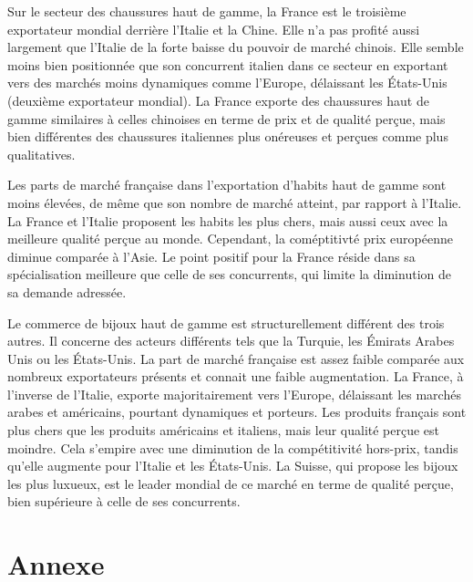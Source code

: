 \documentclass[french,10pt,a4paper]{article}
\begin{document}
\bigskip

Sur le secteur des chaussures haut de gamme, la France est le troisième exportateur mondial derrière l'Italie et la Chine. Elle n'a pas profité aussi largement que l'Italie de la forte baisse du pouvoir de marché chinois. Elle semble moins bien positionnée que son concurrent italien dans ce secteur en exportant vers des marchés moins dynamiques comme l'Europe, délaissant les États-Unis (deuxième exportateur mondial). La France exporte des chaussures haut de gamme similaires à celles chinoises en terme de prix et de qualité perçue, mais bien différentes des chaussures italiennes plus onéreuses et perçues comme plus qualitatives.

\bigskip
Les parts de marché française dans l'exportation d'habits haut de gamme sont moins élevées, de même que son nombre de marché atteint, par rapport à l'Italie. La France et l'Italie proposent les habits les plus chers, mais aussi ceux avec la meilleure qualité perçue au monde. Cependant, la coméptitivté prix européenne diminue comparée à l'Asie. Le point positif pour la France réside dans sa spécialisation meilleure que celle de ses concurrents, qui limite la diminution de sa demande adressée.

\bigskip

Le commerce de bijoux haut de gamme est structurellement différent des trois autres. Il concerne des acteurs différents tels que la Turquie, les Émirats Arabes Unis ou les États-Unis. La part de marché française est assez faible comparée aux nombreux exportateurs présents et connait une faible augmentation. La France, à l'inverse de l'Italie, exporte majoritairement vers l'Europe, délaissant les marchés arabes et américains, pourtant dynamiques et porteurs. Les produits français sont plus chers que les produits américains et italiens, mais leur qualité perçue est moindre. Cela s'empire avec une diminution de la compétitivité hors-prix, tandis qu'elle augmente pour l'Italie et les États-Unis. La Suisse, qui propose les bijoux les plus luxueux, est le leader mondial de ce marché en terme de qualité perçue, bien supérieure à celle de ses concurrents.

\newpage

\section*{Annexe}
\end{document}
